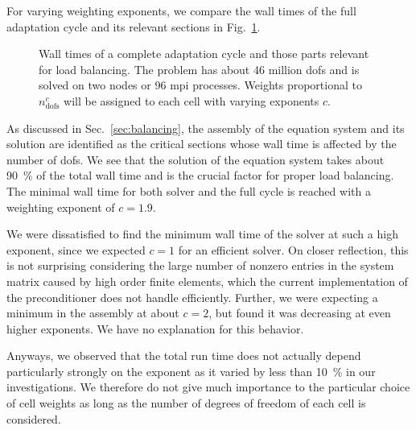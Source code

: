 
For varying weighting exponents, we compare the wall times of the full adaptation cycle and its relevant sections
in Fig.~\ref{fig:weights}.

\begin{figure}
\centering

\caption[Wall times for load balancing with varying weighting exponents.]{Wall times of a complete adaptation cycle and those parts relevant for load balancing. The problem has about 46 million \glspl{dof} and is solved on two nodes or 96 \gls{mpi} processes. Weights proportional to $n_\text{dofs}^c$ will be assigned to each cell with varying exponents $c$.}
\label{fig:weights}
\end{figure}

As discussed in Sec.~\ref{sec:balancing}, the assembly of the equation system and its solution are identified as the critical sections whose wall time is affected by the number of \glspl{dof}. We see that the solution of the equation system takes about \SI{90}{\percent} of the total wall time and is the crucial factor for proper load balancing. The minimal wall time for both solver and the full cycle is reached with a weighting exponent of $c = 1.9$.

We were dissatisfied to find the minimum wall time of the solver at such a high exponent, since we expected $c = 1$ for an efficient solver.
On closer reflection, this is not surprising considering the large number of nonzero entries in the system matrix caused by high order finite elements, which the current implementation of the preconditioner does not handle efficiently.
Further, we were expecting a minimum in the assembly at about $c = 2$, but found it was decreasing at even higher exponents. We have no explanation for this behavior.

Anyways, we observed that the total run time does not actually depend particularly strongly on the exponent as it varied by less than \SI{10}{\percent} in our investigations. We therefore do not give much importance to the particular choice of cell weights as long as the number of degrees of freedom of each cell is considered.


